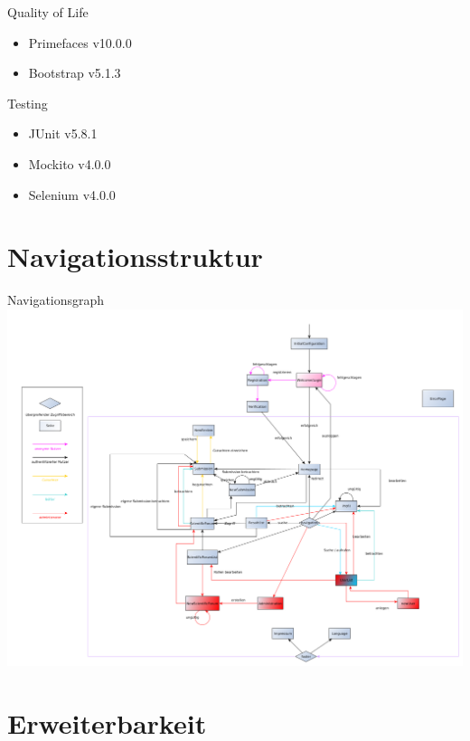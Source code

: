 \documentclass{beamer}
\begin{document}
    \begin{frame}{Quality of Life}
        \begin{itemize}
            \item Primefaces v10.0.0
            \item Bootstrap v5.1.3
        \end{itemize}
    \end{frame}

    \begin{frame}{Testing}
        \begin{itemize}
            \item JUnit v5.8.1
            \item Mockito v4.0.0
            \item Selenium v4.0.0
        \end{itemize}
    \end{frame}


    \section{Navigationsstruktur}
    \begin{frame}{Navigationsgraph}
        \centering
        \includegraphics[height=0.8\textheight]{../../docs/Pflichtenheft/graphics/benutzerFlussyEd-png}
    \end{frame}


    \section{Erweiterbarkeit}
\end{document}
